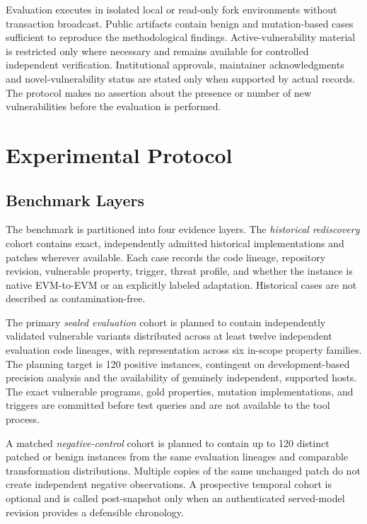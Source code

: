\documentclass[journal]{IEEEtran}
\theoremstyle{definition}
\begin{document}
Evaluation executes in isolated local or read-only fork environments without transaction broadcast. Public artifacts contain benign and mutation-based cases sufficient to reproduce the methodological findings. Active-vulnerability material is restricted only where necessary and remains available for controlled independent verification. Institutional approvals, maintainer acknowledgments and novel-vulnerability status are stated only when supported by actual records. The protocol makes no assertion about the presence or number of new vulnerabilities before the evaluation is performed.



\section{Experimental Protocol}
\label{sec:experimental-protocol}

\subsection{Benchmark Layers}
The benchmark is partitioned into four evidence layers. The \emph{historical rediscovery} cohort contains exact, independently admitted historical implementations and patches wherever available. Each case records the code lineage, repository revision, vulnerable property, trigger, threat profile, and whether the instance is native EVM-to-EVM or an explicitly labeled adaptation. Historical cases are not described as contamination-free.

The primary \emph{sealed evaluation} cohort is planned to contain independently validated vulnerable variants distributed across at least twelve independent evaluation code lineages, with representation across six in-scope property families. The planning target is 120 positive instances, contingent on development-based precision analysis and the availability of genuinely independent, supported hosts. The exact vulnerable programs, gold properties, mutation implementations, and triggers are committed before test queries and are not available to the tool process.

A matched \emph{negative-control} cohort is planned to contain up to 120 distinct patched or benign instances from the same evaluation lineages and comparable transformation distributions. Multiple copies of the same unchanged patch do not create independent negative observations. A prospective temporal cohort is optional and is called post-snapshot only when an authenticated served-model revision provides a defensible chronology.
\end{document}
